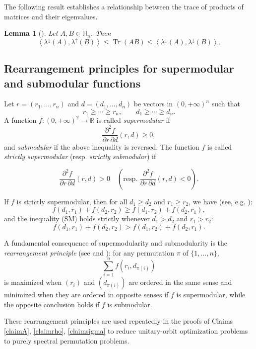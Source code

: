 \documentclass[10pt,reqno]{amsart}
\theoremstyle{break-italic}
\theoremstyle{break-italic}
\theoremstyle{break-italic}
\theoremstyle{break-italic}
\theoremstyle{break-italic}
\theoremstyle{break-italic}
\theoremstyle{break-italic}
\theoremstyle{break-italic}
\newtheorem{lemma}[satz]{Lemma}
\theoremstyle{break-roman}
\theoremstyle{standard}
\theoremstyle{varthm-roman}
\theoremstyle{varthm-italic}
\theoremstyle{varthm-roman-break}
\theoremstyle{varthm-italic-break}
\theoremstyle{varthm-roman-no-punctuation}
\theoremstyle{varthm-italic-no-punctuation}
\numberwithin{equation}{section}
\newcommand{\seq}[1]{\left<#1\right>}
\begin{document}
The following result  establishes a relationship between the trace of products of matrices  and their eigenvalues.

\begin{lemma}[{\cite[Problem III.6.14]{Bh}}]\label{lm-trace-product-powers}
Let $A, B \in \mathbb{H}_n$. Then
\[
\seq{\lambda^{\downarrow}(A), \lambda^{\uparrow}(B)} 
\le \operatorname{Tr}\!\left(A B\right)
\le \seq{\lambda^{\downarrow}(A), \lambda^{\downarrow}(B)}.
\]
\end{lemma}

\subsection{Rearrangement principles for supermodular and submodular functions}

Let $r=(r_1,\dots,r_n)$ and $d=(d_1,\dots,d_n)$ be vectors in $(0,+\infty)^n$ such that
\[
r_1 \ge \cdots \ge r_n, \qquad d_1 \ge \cdots \ge d_n .
\]
A function $f:(0,+\infty)^2 \to \mathbb{R}$ is called \emph{supermodular} if
\[
\frac{\partial^2 f}{\partial r\,\partial d}(r,d) \ge 0,
\]
and \emph{submodular} if the above inequality is reversed. The function $f$  is called \emph{strictly supermodular} (resp. \emph{strictly submodular}) if 

\[
\frac{\partial^2 f}{\partial r\,\partial d}(r,d) > 0 \quad (\mbox{resp. } \frac{\partial^2 f}{\partial r\,\partial d}(r,d) < 0).
\]

If $f$ is strictly supermodular, then for all $d_1 \ge d_2$ and $r_1 \ge r_2$, we have (see, e.g. \cite{Top98}):
\begin{equation}
f(d_1, r_1) + f(d_2, r_2) \ge f(d_1, r_2) + f(d_2, r_1), \tag{SM}
\end{equation}
and the inequality (SM) holds strictly whenever $d_1 > d_2$ and $r_1 > r_2$:
\begin{equation*}
f(d_1, r_1) + f(d_2, r_2) > f(d_1, r_2) + f(d_2, r_1).
\end{equation*}

A fundamental consequence of supermodularity and submodularity is the
\emph{rearrangement principle} (see \cite[Ch.~10]{HLP52} and
\cite[Ch.~2]{Top98}): for any permutation $\pi$ of $\{1,\dots,n\}$,
\[
\sum_{i=1}^n f(r_i,d_{\pi(i)})
\]
is maximized when $(r_i)$ and $(d_{\pi(i)})$ are ordered in the same sense and
minimized when they are ordered in opposite senses if $f$ is supermodular,
while the opposite conclusion holds if $f$ is submodular.

These rearrangement principles are used repeatedly in the proofs of
Claims~ \ref{claimA}, \ref{claimrho}, \ref{claimsigma} to reduce unitary-orbit optimization problems to purely
spectral permutation problems.
\end{document}
